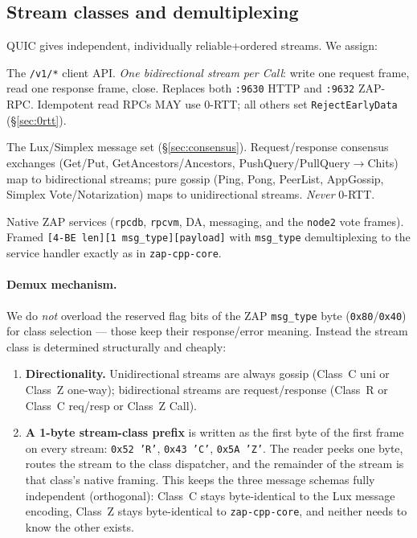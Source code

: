 \documentclass[11pt,a4paper]{article}
\newcommand{\msg}[1]{\textsf{#1}}
\newcommand{\code}[1]{\texttt{#1}}
\begin{document}
\subsection{Stream classes and demultiplexing}\label{sec:demux}

QUIC gives independent, individually reliable+ordered streams. We assign:

\begin{description}[nosep,leftmargin=1.6cm]
  \item[Class~R (RPC)] The \code{/v1/*} client API. \emph{One
        bidirectional stream per Call}: write one request frame, read one
        response frame, close. Replaces both \code{:9630} HTTP and
        \code{:9632} ZAP-RPC. Idempotent read RPCs MAY use 0-RTT; all
        others set \code{RejectEarlyData} (\S\ref{sec:0rtt}).
  \item[Class~C (consensus-P2P)] The Lux/Simplex message set
        (\S\ref{sec:consensus}). Request/response consensus exchanges
        (\msg{Get}/\msg{Put}, \msg{GetAncestors}/\msg{Ancestors},
        \msg{PushQuery}/\msg{PullQuery}$\to$\msg{Chits}) map to
        bidirectional streams; pure gossip
        (\msg{Ping}, \msg{Pong}, \msg{PeerList}, \msg{AppGossip},
        Simplex \msg{Vote}/\msg{Notarization}) maps to unidirectional
        streams. \emph{Never} 0-RTT.
  \item[Class~Z (ZAP-native)] Native ZAP services (\code{rpcdb},
        \code{rpcvm}, DA, messaging, and the \code{node2} vote frames).
        Framed \code{[4-BE len][1 msg\_type][payload]} with
        \code{msg\_type} demultiplexing to the service handler exactly as
        in \code{zap-cpp-core}.
\end{description}

\paragraph{Demux mechanism.} We do \emph{not} overload the reserved
flag bits of the ZAP \code{msg\_type} byte (\code{0x80}/\code{0x40}) for
class selection --- those keep their response/error meaning. Instead the
stream class is determined structurally and cheaply:

\begin{enumerate}[nosep]
  \item \textbf{Directionality.} Unidirectional streams are always gossip
        (Class~C uni or Class~Z one-way); bidirectional streams are
        request/response (Class~R or Class~C req/resp or Class~Z Call).
  \item \textbf{A 1-byte stream-class prefix} is written as the first
        byte of the first frame on every stream:
        \code{0x52 'R'}, \code{0x43 'C'}, \code{0x5A 'Z'}. The reader
        peeks one byte, routes the stream to the class dispatcher, and
        the remainder of the stream is that class's native framing. This
        keeps the three message schemas fully independent (orthogonal):
        Class~C stays byte-identical to the Lux message encoding,
        Class~Z stays byte-identical to \code{zap-cpp-core}, and neither
        needs to know the other exists.
\end{enumerate}
\end{document}
